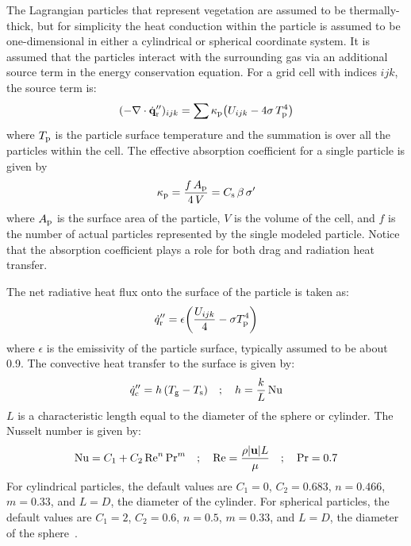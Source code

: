 \documentclass[journal,article,atmosphere,submit,moreauthors,pdftex]{Definitions/mdpi}
\begin{document}
The Lagrangian particles that represent vegetation are assumed to be thermally-thick, but for simplicity the heat conduction within the particle is assumed to be one-dimensional in either a cylindrical or spherical coordinate system. It is assumed that the particles interact with the surrounding gas via an additional source term in the energy conservation equation. For a grid cell with indices $ijk$, the source term is:
\begin{equation} \label{eq:qr}
   (-\nabla \cdot \dot{\mathbf{q}}_{\rm r}'')_{ijk} = \sum \kappa_{\rm p} \left( U_{ijk} - 4 \sigma \, T_{\rm p}^4 \right)
\end{equation}
where $T_{\rm p}$ is the particle surface temperature and the summation is over all the particles within the cell. The effective absorption coefficient for a single particle is given by
\begin{equation}
   \kappa_{\rm p} = \frac{f \, A_{\rm p}}{4 \, V} = C_{\rm s}  \, \beta \, \sigma'
\end{equation}
where $A_{\rm p}$ is the surface area of the particle, $V$ is the volume of the cell, and $f$ is the number of actual particles represented by the single modeled particle. Notice that the absorption coefficient plays a role for both drag and radiation heat transfer.

The net radiative heat flux onto the surface of the particle is taken as:
\begin{equation}
   \dot{q}_{\rm r}'' = \epsilon \left( \frac{U_{ijk}}{4} - \sigma T_{\rm p}^4 \right)
\end{equation}
where $\epsilon$ is the emissivity of the particle surface, typically assumed to be about 0.9. The convective heat transfer to the surface is given by:
\begin{equation}
   \dot{q}_{\rm c}'' = h \, (T_{\rm g} - T_{\rm s})  \quad ; \quad  h = \frac{k}{L} \, \hbox{Nu}  \label{q_con}
\end{equation} 
$L$ is a characteristic length equal to the diameter of the sphere or cylinder. The Nusselt number is given by:
\begin{equation}
   \hbox{Nu} = C_1 + C_2 \, \hbox{Re}^n \, \hbox{Pr}^m  \quad ; \quad \hbox{Re} = \frac{\rho |\mathbf{u}| L}{\mu} \quad ; \quad \hbox{Pr} = 0.7 
\end{equation}
For cylindrical particles, the default values are $C_1=0$, $C_2=0.683$, $n=0.466$, $m=0.33$, and $L=D$, the diameter of the cylinder. For spherical particles, the default values are $C_1=2$, $C_2=0.6$, $n=0.5$, $m=0.33$, and $L=D$, the diameter of the sphere~\cite{Incropera:1}.
\end{document}
